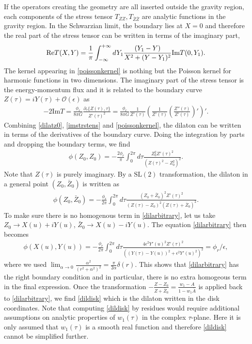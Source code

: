 \documentclass[12pt]{article}
\newcommand{\f}{\frac}
\let\f=\frac
\let\pa=\partial
\def\ba{\begin{eqnarray}}
\def\ea{\end{eqnarray}}
\numberwithin{equation}{section}
\def\ba{\begin{eqnarray}}
\def\ea{\end{eqnarray}}
\def\f {\frac}
\begin{document}
\begin{spacing}{1.1}
If the operators creating the geometry are all inserted outside the gravity region, each components of the stress tensor $T_{ZZ}, T_{\bar{Z} \bar{Z}}$ are analytic functions in the gravity region. In the Schwarzian limit, the boundary lies at $X=0$ and therefore the  real part of the stress tensor can be written in terms of the imaginary part,
\ba\label{poissonkernel}
{\rm Re} T( X,Y) = \frac{1}{\pi} \int_{-\infty}^{+\infty} dY_1 \f{(Y_1 - Y)}{X^2 + (Y-Y_1)^2} \text{Im}T (0, Y_1).
\ea
 The kernel appearing in \eqref{poissonkernel} is nothing but the Poisson kernel for harmonic functions in two dimensions. The imaginary part of the stress tensor is the energy-momentum flux and it is related to the boundary curve $Z(\tau)=  i Y(\tau)+ \mathcal{O}(\epsilon)$ as
\ba\label{imstrstens}
-2\text{Im} T = \f{\phi_r}{8 \pi G}\f{\pa_\tau \{ Z(\tau), \tau\}}{ Z'(\tau)^2} = \f{\phi_r}{8 \pi G} \f{1}{Z'(\tau)}\left( \f{1}{Z'(\tau)} \left( \f{Z''(\tau)}{Z'(\tau)} \right)' \right)'.
\ea 
 Combining \eqref{dilatz0}, \eqref{imstrstens} and \eqref{poissonkernel}, the dilaton can be written in terms of the derivatives of the boundary curve. Doing the integration by parts and dropping the boundary terms, we find 
\ba\label{finaldil}
\phi(Z_0,Z_0) = - \frac{2\phi_r}{\pi} \int_{0}^{2\pi} d\tau \f{Z_0^2 Z'(\tau)^2}{(Z(\tau)^2- Z_0^2)^2}.
\ea
Note that $Z(\tau)$ is purely imaginary. By a $\text{SL}(2)$ transformation, the dilaton in a general point $(Z_0, \bar{Z}_0)$ is written as
\ba\label{dilarbitrary}
\phi(Z_0, \bar{Z}_0) = - \f{\phi_r}{2\pi } \int_{0}^{2\pi} d\tau \f{(Z_0+ \bar{Z}_0)^2 Z'(\tau)^2}{(Z(\tau) - Z_0)^2 (Z(\tau)+ \bar{Z}_0)^2}.
\ea
To make sure there is no homogenous term in \eqref{dilarbitrary}, let us take $Z_0 \to X(u) + i Y(u)$, $\bar{Z}_0 \to X(u) - i Y(u)$. The equation \eqref{dilarbitrary} then becomes
\ba
\phi(X(u), Y(u)) = - \f{\phi_r}{2\pi} \int_{0}^{2\pi} d\tau \f{4 \epsilon^2 Y'(u)^2 Z'(\tau)^2}{ ((Y(\tau) - Y(u))^2 + \epsilon^2 Y'(u)^2)^2} = \phi_r/\epsilon,
\ea
where we used $\lim_{\alpha \to 0} \f{\alpha^2}{(r^2+ \alpha^2)^2} = \f{\pi}{2 \alpha} \delta (r)$. This shows that \eqref{dilarbitrary} has the right boundary condition and in particular, there is no extra homogeous term in the final expression. Once the transformation $ - \frac{Z-Z_0}{Z+\bar{Z}_0} = \frac{w_1-A}{1- w_1\bar{A}}$ is applied back to \eqref{dilarbitrary}, we find \eqref{dildisk} which is the dilaton written in the disk coordinates. Note that computing \eqref{dildisk} by residues would require additional assumptions on analytic properties of $w_1(\tau)$ in the complex $\tau$-plane. Here it is only assumed that $w_1(\tau)$ is a smooth real function and therefore \eqref{dildisk} cannot be simplified further.



\end{spacing}
\end{document}
